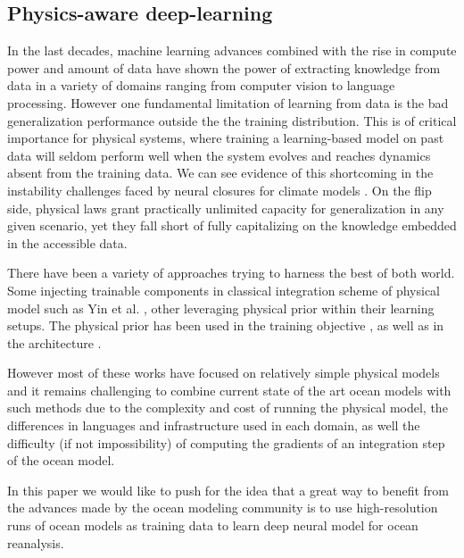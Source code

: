 \documentclass[draft]{agujournal2019}
\begin{document}
\subsection{Physics-aware deep-learning}
\label{ssec:deeplearning}
In the last decades, machine learning advances combined with the rise in compute power and amount of data have shown the power of extracting knowledge from data in a variety of domains ranging from computer vision to language processing. 
However one fundamental limitation of learning from data is the bad generalization performance outside the the training distribution. This is of critical importance for physical systems, where training a learning-based model on past data will seldom perform well when the system evolves and reaches dynamics absent from the training data. We can see evidence of this shortcoming in the instability challenges faced by neural closures for climate models \cite{brenowitzInterpretingStabilizingMachineLearning2020}. 
On the flip side, physical laws grant practically unlimited capacity for generalization in any given scenario, yet they fall short of fully capitalizing on the knowledge embedded in the accessible data.

There have been a variety of approaches trying to harness the best of both world. Some injecting trainable components in classical integration scheme of physical model such as Yin et al. \cite{yinAugmentingPhysicalModels2021b}, other leveraging physical prior within their learning setups. The physical prior has been used in the training objective \cite{raissiPhysicsinformedNeuralNetworks2019,greydanusHamiltonianNeuralNetworks2019}, as well as in the architecture \cite{li2020fourier,Wang2020TF}.

However most of these works have focused on relatively simple physical models and it remains challenging to combine current state of the art ocean models with such methods due to the complexity and cost of running the physical model, the differences in languages and infrastructure used in each domain, as well the difficulty (if not impossibility) of computing the gradients of an integration step of the ocean model.

In this paper we would like to push for the idea that a great way to benefit from the advances made by the ocean modeling community is to use high-resolution runs of ocean models as training data to learn deep neural model for ocean reanalysis. 
\end{document}
